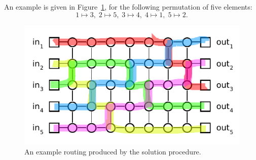 \documentclass[12pt,oneside]{article}
\begin{document}
\begin{problem}{18}
{        An example is given in Figure~\ref{swapex}, for the following
        permutation of five elements:
        $$ 1 \mapsto 3, \; 2 \mapsto 5,\; 3 \mapsto 4,\; 4 \mapsto 1,\; 5 \mapsto 2. $$

        \begin{figure}[h]
            \begin{center}\includegraphics[width=12cm]{swapex.pdf}\end{center}
            \caption{An example routing produced by the solution procedure.}
            \label{swapex}
        \end{figure}
    }

\eparts

\end{problem}
\end{document}
